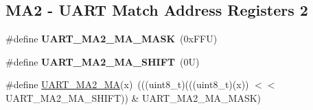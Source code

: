 \subsection*{M\+A2 -\/ U\+A\+RT Match Address Registers 2}
\begin{DoxyCompactItemize}
\item 
\mbox{\label{group___u_a_r_t___register___masks_ga700f51ab869350daee42b8ae9c655ffd}} 
\#define {\bfseries U\+A\+R\+T\+\_\+\+M\+A2\+\_\+\+M\+A\+\_\+\+M\+A\+SK}~(0x\+F\+F\+U)
\item 
\mbox{\label{group___u_a_r_t___register___masks_ga1ecfe245065ed459b087fc0d629b3f07}} 
\#define {\bfseries U\+A\+R\+T\+\_\+\+M\+A2\+\_\+\+M\+A\+\_\+\+S\+H\+I\+FT}~(0\+U)
\item 
\#define \mbox{\hyperlink{group___u_a_r_t___register___masks_gaf2427a2534075e01475f46219e742b00}{U\+A\+R\+T\+\_\+\+M\+A2\+\_\+\+MA}}(x)~(((uint8\+\_\+t)(((uint8\+\_\+t)(x)) $<$$<$ U\+A\+R\+T\+\_\+\+M\+A2\+\_\+\+M\+A\+\_\+\+S\+H\+I\+FT)) \& U\+A\+R\+T\+\_\+\+M\+A2\+\_\+\+M\+A\+\_\+\+M\+A\+SK)
\end{DoxyCompactItemize}
